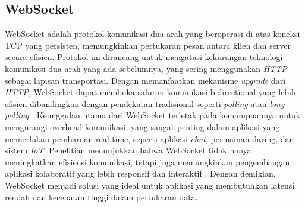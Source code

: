 \subsection{WebSocket}
WebSocket adalah protokol komunikasi dua arah yang beroperasi di atas koneksi TCP yang persisten, memungkinkan pertukaran pesan antara klien dan server secara efisien. Protokol ini dirancang untuk mengatasi kekurangan teknologi komunikasi dua arah yang ada sebelumnya, yang sering menggunakan \emph{HTTP} sebagai lapisan transportasi. Dengan memanfaatkan mekanisme \emph{upgrade} dari \emph{HTTP}, WebSocket dapat membuka saluran komunikasi bidirectional yang lebih efisien dibandingkan dengan pendekatan tradisional seperti \emph{polling} atau \emph{long polling} \cite{Fette2011}. Keunggulan utama dari WebSocket terletak pada kemampuannya untuk mengurangi overhead komunikasi, yang sangat penting dalam aplikasi yang memerlukan pembaruan real-time, seperti aplikasi \emph{chat}, permainan daring, dan sistem \emph{IoT}. Penelitian menunjukkan bahwa WebSocket tidak hanya meningkatkan efisiensi komunikasi, tetapi juga memungkinkan pengembangan aplikasi kolaboratif yang lebih responsif dan interaktif \cite{Milsap2019}. Dengan demikian, WebSocket menjadi solusi yang ideal untuk aplikasi yang membutuhkan latensi rendah dan kecepatan tinggi dalam pertukaran data.


